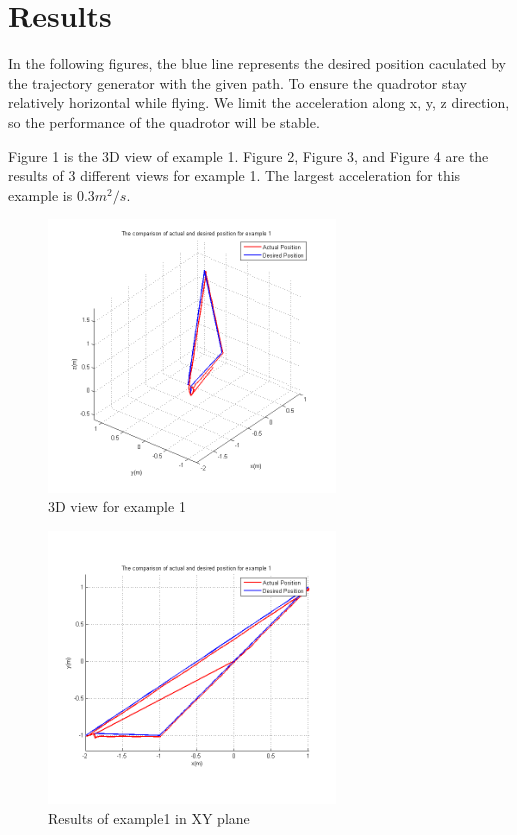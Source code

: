 \section{Results}
In the following figures, the blue line represents the desired position caculated by the trajectory generator with the given path. To ensure the quadrotor stay relatively horizontal while flying. We limit the acceleration along x, y, z direction, so the performance of the quadrotor will be stable. 

Figure 1 is the 3D view of example 1. Figure 2, Figure 3, and Figure 4 are the results of 3 different views for example 1. The largest acceleration for this example is $0.3m^2/s$. 
\begin{figure}[H]
  \centering
  \includegraphics[width=3in]{Ex1_03_3D.png}
  \caption{3D view for example 1}
\end{figure}

\begin{figure}[H]
  \centering
  \includegraphics[width=3in]{Ex1_03_XY.PNG}
  \caption{Results of example1 in XY plane}
\end{figure}

